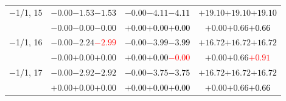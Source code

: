 \documentclass[compress]{beamer}
\begin{document}
\begin{frame}
\begin{tabular}{r | c | c | c}
$-$1/1, 15 & $-0.00$\hspace{0.1 cm}$-1.53$\hspace{0.1 cm}\textcolor{black}{$-1.53$} & $-0.00$\hspace{0.1 cm}$-4.11$\hspace{0.1 cm}\textcolor{black}{$-4.11$} & $+19.10$\hspace{0.1 cm}$+19.10$\hspace{0.1 cm}\textcolor{black}{$+19.10$} \\
           & $-0.00$\hspace{0.1 cm}$-0.00$\hspace{0.1 cm}\textcolor{black}{$-0.00$} & $+0.00$\hspace{0.1 cm}$+0.00$\hspace{0.1 cm}\textcolor{black}{$+0.00$} & $+0.00$\hspace{0.1 cm}$+0.66$\hspace{0.1 cm}\textcolor{black}{$+0.66$} \\
$-$1/1, 16 & $-0.00$\hspace{0.1 cm}$-2.24$\hspace{0.1 cm}\textcolor{red}{$-2.99$} & $-0.00$\hspace{0.1 cm}$-3.99$\hspace{0.1 cm}\textcolor{black}{$-3.99$} & $+16.72$\hspace{0.1 cm}$+16.72$\hspace{0.1 cm}\textcolor{black}{$+16.72$} \\
           & $-0.00$\hspace{0.1 cm}$+0.00$\hspace{0.1 cm}\textcolor{black}{$+0.00$} & $+0.00$\hspace{0.1 cm}$+0.00$\hspace{0.1 cm}\textcolor{red}{$-0.00$} & $+0.00$\hspace{0.1 cm}$+0.66$\hspace{0.1 cm}\textcolor{red}{$+0.91$} \\
$-$1/1, 17 & $-0.00$\hspace{0.1 cm}$-2.92$\hspace{0.1 cm}\textcolor{black}{$-2.92$} & $-0.00$\hspace{0.1 cm}$-3.75$\hspace{0.1 cm}\textcolor{black}{$-3.75$} & $+16.72$\hspace{0.1 cm}$+16.72$\hspace{0.1 cm}\textcolor{black}{$+16.72$} \\
           & $+0.00$\hspace{0.1 cm}$+0.00$\hspace{0.1 cm}\textcolor{black}{$+0.00$} & $+0.00$\hspace{0.1 cm}$+0.00$\hspace{0.1 cm}\textcolor{black}{$+0.00$} & $+0.00$\hspace{0.1 cm}$+0.66$\hspace{0.1 cm}\textcolor{black}{$+0.66$} \\

\end{tabular}
\end{frame}
\end{document}
